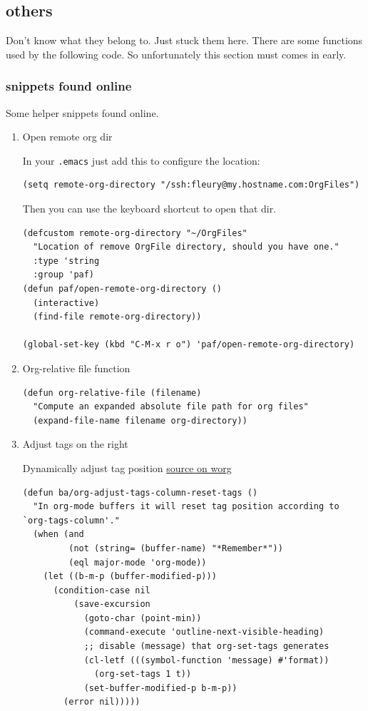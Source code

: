 \documentclass[11pt]{article}
\begin{document}
\subsection{others}
\label{sec:orgd8f99fa}

Don't know what they belong to. Just stuck them here. There are some functions used by the following code. So unfortunately this section must comes in early.

\subsubsection{snippets found online}
\label{sec:orgf5a30cb}

Some helper snippets found online.

\begin{enumerate}
\item Open remote org dir
\label{sec:org0e098f5}

In your \texttt{.emacs} just add this to configure the location:

\begin{verbatim}
(setq remote-org-directory "/ssh:fleury@my.hostname.com:OrgFiles")
\end{verbatim}

Then you can use the keyboard shortcut to open that dir.

\begin{verbatim}
(defcustom remote-org-directory "~/OrgFiles"
  "Location of remove OrgFile directory, should you have one."
  :type 'string
  :group 'paf)
(defun paf/open-remote-org-directory ()
  (interactive)
  (find-file remote-org-directory))

(global-set-key (kbd "C-M-x r o") 'paf/open-remote-org-directory)
\end{verbatim}

\item Org-relative file function
\label{sec:org9bcc637}

\begin{verbatim}
(defun org-relative-file (filename)
  "Compute an expanded absolute file path for org files"
  (expand-file-name filename org-directory))
\end{verbatim}
\item Adjust tags on the right
\label{sec:org2108d83}

Dynamically adjust tag position \href{https://orgmode.org/worg/org-hacks.html\#org0560357}{source on worg}

\begin{verbatim}
(defun ba/org-adjust-tags-column-reset-tags ()
  "In org-mode buffers it will reset tag position according to
`org-tags-column'."
  (when (and
         (not (string= (buffer-name) "*Remember*"))
         (eql major-mode 'org-mode))
    (let ((b-m-p (buffer-modified-p)))
      (condition-case nil
          (save-excursion
            (goto-char (point-min))
            (command-execute 'outline-next-visible-heading)
            ;; disable (message) that org-set-tags generates
            (cl-letf (((symbol-function 'message) #'format))
              (org-set-tags 1 t))
            (set-buffer-modified-p b-m-p))
        (error nil)))))


\end{verbatim}
\end{enumerate}
\end{document}
